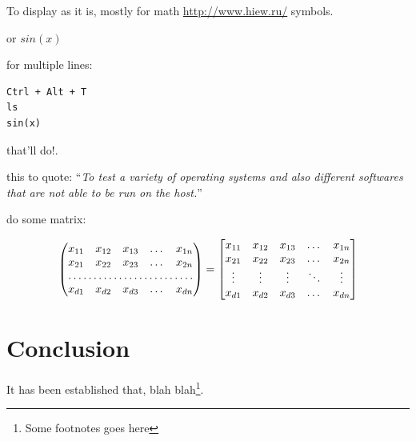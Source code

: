 \documentclass[twocolumn]{article}
\begin{document}
To display as it is, mostly for math \url{http://www.hiew.ru/} symbols.

or
$sin(x)$

for multiple lines:\newline

\begin{verbatim}
Ctrl + Alt + T
ls
sin(x)
\end{verbatim}

that'll do!.

this to quote:
``\emph{To test a variety of operating systems and also different softwares that
are not able to be run on the host.}''

do some matrix:\newline

\[
\begin{pmatrix}
	x_{11} & x_{12} & x_{13} & \dots & x_{1n} \\
	x_{21} & x_{22} & x_{23} & \dots & x_{2n} \\
	\hdotsfor{5} \\
	x_{d1} & x_{d2} & x_{d3} & \dots & x_{dn}
\end{pmatrix}
=
\begin{bmatrix}
	x_{11} & x_{12} & x_{13} & \dots & x_{1n} \\
	x_{21} & x_{22} & x_{23} & \dots & x_{2n} \\
	\vdots & \vdots & \vdots & \ddots & \vdots \\
	x_{d1} & x_{d2} & x_{d3} & \dots & x_{dn}
\end{bmatrix}
\]

\section{Conclusion}
It has been established that, blah blah\footnote{Some footnotes goes here}.



\end{document}
